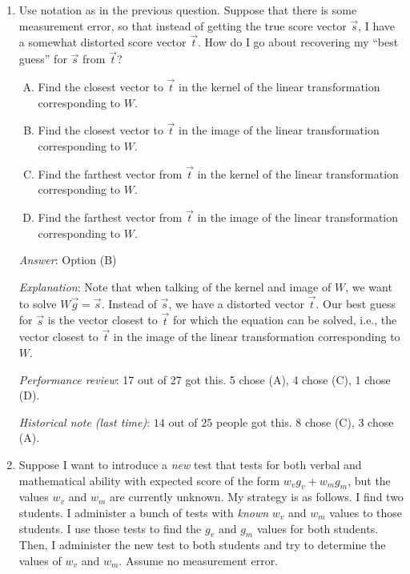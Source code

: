 \documentclass[10pt]{amsart}
\begin{document}
\begin{enumerate}
  {\em Historical note (last time)}: $14$ out of $25$ people got this. $4$ each
  chose (A) and (C). $3$ chose (B).

\item Use notation as in the previous question. Suppose that there is
  some measurement error, so that instead of getting the true score
  vector $\vec{s}$, I have a somewhat distorted score vector
  $\vec{t}$. How do I go about recovering my ``best guess'' for
  $\vec{s}$ from $\vec{t}$?

  \begin{enumerate}[(A)]
  \item Find the closest vector to $\vec{t}$ in the kernel of the
    linear transformation corresponding to $W$.
  \item Find the closest vector to $\vec{t}$ in the image of the
    linear transformation corresponding to $W$.
  \item Find the farthest vector from $\vec{t}$ in the kernel of the
    linear transformation corresponding to $W$.
  \item Find the farthest vector from $\vec{t}$ in the image of the
    linear transformation corresponding to $W$.
  \end{enumerate}

  {\em Answer}: Option (B)

  {\em Explanation}: Note that when talking of the kernel and image of
  $W$, we want to solve $W\vec{g} = \vec{s}$. Instead of $\vec{s}$, we
  have a distorted vector $\vec{t}$. Our best guess for $\vec{s}$ is
  the vector closest to $\vec{t}$ for which the equation can be
  solved, i.e., the vector closest to $\vec{t}$ in the image of the
  linear transformation corresponding to $W$.

  {\em Performance review}: 17 out of 27 got this. 5 chose (A), 4
  chose (C), 1 chose (D).

  {\em Historical note (last time)}: $14$ out of $25$ people got this. $8$
  chose (C), $3$ chose (A).

\item Suppose I want to introduce a {\em new} test that tests for both
  verbal and mathematical ability with expected score of the form
  $w_vg_v + w_mg_m$, but the values $w_v$ and $w_m$ are currently
  unknown. My strategy is as follows. I find two students. I
  administer a bunch of tests with {\em known} $w_v$ and $w_m$ values
  to those students. I use those tests to find the $g_v$ and $g_m$
  values for both students. Then, I administer the new test to both
  students and try to determine the values of $w_v$ and $w_m$. Assume no measurement error.


\end{enumerate}
\end{document}
